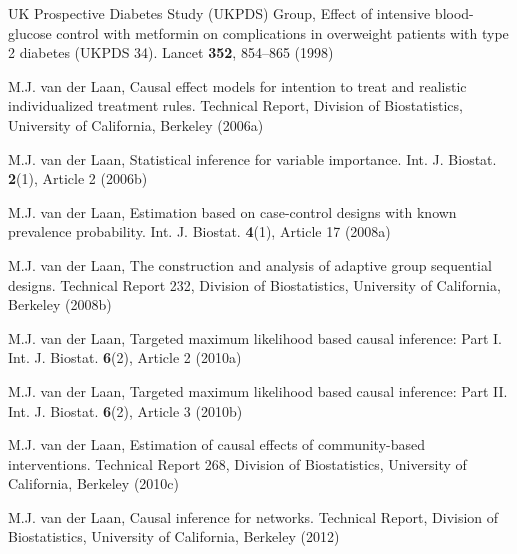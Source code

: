 \begin{list}{}{\setlength{\leftmargin}{2.1em}\setlength{\labelwidth}{0pt}
  \setlength{\labelsep}{0pt}\setlength{\itemindent}{-2.1em}
  \setlength{\parsep}{0pt}\setlength{\itemsep}{2pt}\setlength{\topsep}{0pt}}
\item\label{refentry:REF407}UK Prospective Diabetes Study (UKPDS) Group, Effect of intensive blood-glucose control with metformin on complications in overweight patients with type 2 diabetes (UKPDS 34). Lancet \textbf{352}, 854--865 (1998)\label{refend:REF407}
\item\label{refentry:REF408}M.J. van der Laan, Causal effect models for intention to treat and realistic individualized treatment rules. Technical Report, Division of Biostatistics, University of California, Berkeley (2006a)\label{refend:REF408}
\item\label{refentry:REF409}M.J. van der Laan, Statistical inference for variable importance. Int. J. Biostat. \textbf{2}(1), Article 2 (2006b)\label{refend:REF409}
\item\label{refentry:REF410}M.J. van der Laan, Estimation based on case-control designs with known prevalence probability. Int. J. Biostat. \textbf{4}(1), Article 17 (2008a)\label{refend:REF410}
\item\label{refentry:REF411}M.J. van der Laan, The construction and analysis of adaptive group sequential designs. Technical Report 232, Division of Biostatistics, University of California, Berkeley (2008b)\label{refend:REF411}
\item\label{refentry:REF412}M.J. van der Laan, Targeted maximum likelihood based causal inference: Part I. Int. J. Biostat. \textbf{6}(2), Article 2 (2010a)\label{refend:REF412}
\item\label{refentry:REF413}M.J. van der Laan, Targeted maximum likelihood based causal inference: Part II. Int. J. Biostat. \textbf{6}(2), Article 3 (2010b)\label{refend:REF413}
\item\label{refentry:REF414}M.J. van der Laan, Estimation of causal effects of community-based interventions. Technical Report 268, Division of Biostatistics, University of California, Berkeley (2010c)\label{refend:REF414}
\item\label{refentry:REF415}M.J. van der Laan, Causal inference for networks. Technical Report, Division of Biostatistics, University of California, Berkeley (2012)\label{refend:REF415}

\end{list}
